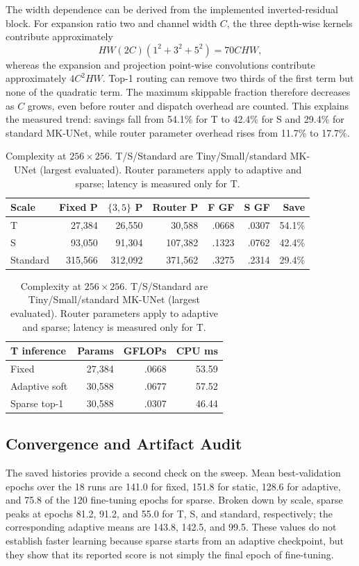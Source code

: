 \documentclass[conference]{IEEEtran}
\begin{document}
The width dependence can be derived from the implemented inverted-residual block. For expansion ratio two and channel width $C$, the three depth-wise kernels contribute approximately
\begin{equation}
    HW(2C)(1^2+3^2+5^2)=70CHW,
    \label{eq:dwcost}
\end{equation}
whereas the expansion and projection point-wise convolutions contribute approximately $4C^2HW$. Top-1 routing can remove two thirds of the first term but none of the quadratic term. The maximum skippable fraction therefore decreases as $C$ grows, even before router and dispatch overhead are counted. This explains the measured trend: savings fall from 54.1\% for T to 42.4\% for S and 29.4\% for standard MK-UNet, while router parameter overhead rises from 11.7\% to 17.7\%.

\begin{table}[t]
\caption{Complexity at $256\times256$. T/S/Standard are Tiny/Small/standard MK-UNet (largest evaluated). Router parameters apply to adaptive and sparse; latency is measured only for T.}
\label{tab:efficiency}
\centering
\scriptsize
\setlength{\tabcolsep}{3.4pt}
\begin{tabular}{lrrrrrr}
\toprule
Scale & Fixed P & $\{3,5\}$ P & Router P & F GF & S GF & Save \\
\midrule
T    & 27,384  & 26,550  & 30,588  & .0668 & .0307 & 54.1\% \\
S    & 93,050  & 91,304  & 107,382 & .1323 & .0762 & 42.4\% \\
Standard & 315,566 & 312,092 & 371,562 & .3275 & .2314 & 29.4\% \\
\bottomrule
\end{tabular}
\vspace{2pt}

\begin{tabular}{lrrr}
\toprule
T inference & Params & GFLOPs & CPU ms \\
\midrule
Fixed         & 27,384 & .0668 & 53.59 \\
Adaptive soft & 30,588 & .0677 & 57.52 \\
Sparse top-1  & 30,588 & .0307 & 46.44 \\
\bottomrule
\end{tabular}
\end{table}

\subsection{Convergence and Artifact Audit}
The saved histories provide a second check on the sweep. Mean best-validation epochs over the 18 runs are 141.0 for fixed, 151.8 for static, 128.6 for adaptive, and 75.8 of the 120 fine-tuning epochs for sparse. Broken down by scale, sparse peaks at epochs 81.2, 91.2, and 55.0 for T, S, and standard, respectively; the corresponding adaptive means are 143.8, 142.5, and 99.5. These values do not establish faster learning because sparse starts from an adaptive checkpoint, but they show that its reported score is not simply the final epoch of fine-tuning.
\end{document}
